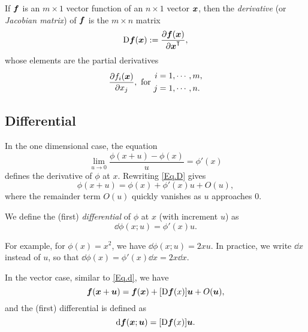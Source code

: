 \theoremstyle{definition}
\begin{definition}[Derivatives]\label{Def.D}
  If $\boldsymbol{f}$ is an $m\times 1$ vector function of an $n\times 1$ vector $\boldsymbol{x}$, then the \emph{derivative} (or \emph{Jacobian matrix}) of $\boldsymbol{f}$ is the $m\times n$ matrix
  \begin{equation}\label{Eq.Def.D}
    \D\m{f}(\m{x}):=\frac{\partial\m{f}(\m{x})}{\partial\T{x}},
  \end{equation}
  whose elements are the partial derivatives
  \begin{equation*}
    \frac{\partial f_i(\m{x})}{\partial x_j},\ \text{for}\ %
    \begin{aligned}
      i&=1,\cdots,m,\\
      j&=1,\cdots,n.
    \end{aligned}
  \end{equation*}
\end{definition}

\subsection{Differential}

In the one dimensional case, the equation
\begin{equation}\label{Eq.D}
  \lim_{u\to 0}\frac{\phi(x+u)-\phi(x)}{u}=\phi'(x)
\end{equation}
defines the derivative of $\phi$ at $x$. Rewriting \cref{Eq.D} gives
\begin{equation}\label{Eq.d}
  \phi(x+u)=\phi(x)+\phi'(x)u+O(u),
\end{equation}
where the remainder term $O(u)$ quickly vanishes as $u$ approaches $0$.

\theoremstyle{definition}
\begin{definition}[Differential]
  We define the (first) \emph{differential} of $\phi$ at $x$ (with increment $u$) as
  \begin{equation}
    \dd\phi(x;u)=\phi'(x)u.
  \end{equation}
\end{definition}

For example, for $\phi(x)=x^2$, we have $\dd\phi(x;u)=2xu$. In practice, we write $\dd x$ instead of $u$, so that $\dd\phi(x)=\phi'(x)\dd x=2x\dd x.$

In the vector case, similar to \cref{Eq.d}, we have
\begin{equation}
  \boldsymbol{f}(\boldsymbol{x}+\boldsymbol{u})=\boldsymbol{f}(\boldsymbol{x})+[\mathrm{D}\boldsymbol{f}(x)]\boldsymbol{u}+O(\boldsymbol{u}),
\end{equation}
and the (first) differential is defined as
\begin{equation}
  \mathrm{d}\boldsymbol{f}(\boldsymbol{x};\boldsymbol{u})=[\mathrm{D}\boldsymbol{f}(x)]\boldsymbol{u}.
\end{equation}

